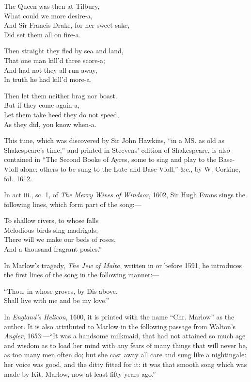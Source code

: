 \begin{dcverse}
\begin{altverse}
The Queen was then at Tilbury,\\
What could we more desire-a,\\
And Sir Francis Drake, for her sweet sake,\\
Did set them all on fire-a.
\end{altverse}

\begin{altverse}
Then straight they fled by sea and land,\\
That one man kill’d three score-a;\\
And had not they all run away,\\
In truth he had kill’d more-a.
\end{altverse}

\begin{altverse}
Then let them neither brag nor boast.\\
But if they come again-a,\\
Let them take heed they do not speed,\\
As they did, you know when-a.
\end{altverse}
\end{dcverse}


This tune, which was discovered by Sir John Hawkins, “in a MS. as old as
Shakespeare’s time,” and printed in Steevens’ edition of Shakespeare, is also contained
in “The Second Booke of Ayres, some to sing and play to the Base-Violl
alone: others to be sung to the Lute and Base-Violl,” \&c., by W. Corkine,
fol.~1612.

In act iii., sc. 1, of \textit{The Merry Wives of Windsor}, 1602, Sir Hugh Evans sings
the following lines, which form part of the song:—
\settowidth{\versewidth}{Thou, in whose groves, by Dis above,}
\begin{scverse}
To shallow rivers, to whose falls\\
Melodious birds sing madrigals;\\
There will we make our beds of roses,\\
And a thousand fragrant posies.”
\end{scverse}
In Marlow’s tragedy, \textit{The Jew of Malta}, written in or before 1591, he introduces
the first lines of the song in the following manner:—
\begin{scverse}
“Thou, in whose groves, by Dis above,\\
Shall live with me and be my love.”
\end{scverse}
In \textit{England's Helicon}, 1600, it is printed with the name “Chr. Marlow” as the
author. It is also attributed to Marlow in the following passage from Walton’s
\textit{Angler}, 1653:—“It was a handsome milkmaid, that had not attained so much
age and wisdom as to load her mind with any fears of many things that will never
be, as too many men often do; but she cast away all care and sung like a nightingale: 
her voice was good, and the ditty fitted for it: it was that smooth song
which was made by Kit. Marlow, now at least fifty years ago.”
\pagebreak

